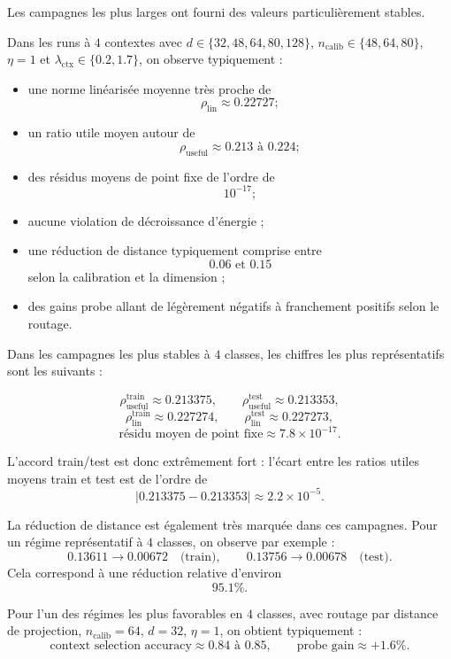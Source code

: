 \documentclass[11pt,a4paper]{article}
\newcommand{\1}{\mathbf 1}
\begin{document}
Les campagnes les plus larges ont fourni des valeurs particulièrement stables.

Dans les runs à \(4\) contextes avec \(d\in\{32,48,64,80,128\}\), \(n_{\mathrm{calib}}\in\{48,64,80\}\), \(\eta=1\) et \(\lambda_{\mathrm{ctx}}\in\{0.2,1.7\}\), on observe typiquement :

\begin{itemize}[leftmargin=2em]
    \item une norme linéarisée moyenne très proche de
    \[
    \rho_{\mathrm{lin}} \approx 0.22727 ;
    \]
    \item un ratio utile moyen autour de
    \[
    \rho_{\mathrm{useful}} \approx 0.213 \text{ à } 0.224 ;
    \]
    \item des résidus moyens de point fixe de l’ordre de
    \[
    10^{-17} ;
    \]
    \item aucune violation de décroissance d’énergie ;
    \item une réduction de distance typiquement comprise entre
    \[
    0.06 \text{ et } 0.15
    \]
    selon la calibration et la dimension ;
    \item des gains probe allant de légèrement négatifs à franchement positifs selon le routage.
\end{itemize}

Dans les campagnes les plus stables à \(4\) classes, les chiffres les plus représentatifs sont les suivants :

\[
\rho_{\mathrm{useful}}^{\mathrm{train}} \approx 0.213375,
\qquad
\rho_{\mathrm{useful}}^{\mathrm{test}} \approx 0.213353,
\]
\[
\rho_{\mathrm{lin}}^{\mathrm{train}} \approx 0.227274,
\qquad
\rho_{\mathrm{lin}}^{\mathrm{test}} \approx 0.227273,
\]
\[
\text{résidu moyen de point fixe} \approx 7.8\times 10^{-17}.
\]

L’accord train/test est donc extrêmement fort : l’écart entre les ratios utiles moyens train et test est de l’ordre de
\[
|0.213375 - 0.213353| \approx 2.2\times 10^{-5}.
\]

La réduction de distance est également très marquée dans ces campagnes. Pour un régime représentatif à \(4\) classes, on observe par exemple :
\[
0.13611 \rightarrow 0.00672 \quad \text{(train)},
\qquad
0.13756 \rightarrow 0.00678 \quad \text{(test)}.
\]
Cela correspond à une réduction relative d’environ
\[
95.1\%.
\]

Pour l’un des régimes les plus favorables en \(4\) classes, avec routage par distance de projection, \(n_{\mathrm{calib}}=64\), \(d=32\), \(\eta=1\), on obtient typiquement :
\[
\text{context selection accuracy}\approx 0.84 \text{ à } 0.85,
\qquad
\text{probe gain}\approx +1.6\%.
\]
\end{document}
